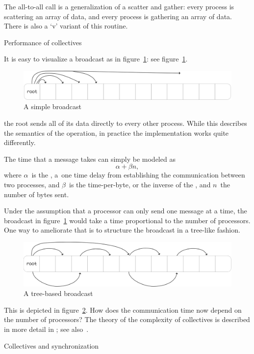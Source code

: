 The all-to-all call is a generalization of a scatter and gather: every
process is scattering an array of data, and every process is gathering
an array of data. There is also a `v' variant of this routine.

 {Performance of collectives}

It is easy to visualize a broadcast as in figure~\ref{fig:bcast-simple}:
see figure~\ref{fig:bcast-simple}.
\begin{figure}[ht]
  \includegraphics[scale=.08]{graphics/bcast-simple}
  \caption{A simple broadcast}
  \label{fig:bcast-simple}
\end{figure}
the root sends all of its data directly to every other process.
While this describes the semantics of the operation, in practice
the implementation works quite differently.

The time that a message takes can simply be modeled as
\[ \alpha +\beta n, \]
where $\alpha$~is the , a~one time
delay from establishing the communication between two processes,
and $\beta$~is the time-per-byte, or the inverse of the ,
and $n$~the number of bytes sent.

Under the assumption that
a processor can only send one message at a time,
the broadcast in
figure~\ref{fig:bcast-simple} would take a time proportional to the
number of processors. One way to ameliorate that is to structure the
broadcast in a tree-like fashion.
\begin{figure}[ht]
  \includegraphics[scale=.1]{graphics/bcast-tree}
  \caption{A tree-based broadcast}
  \label{fig:bcast-tree}
\end{figure}
This is depicted in figure~\ref{fig:bcast-tree}. How does the
communication time now depend on the number of processors? The theory
of the complexity of collectives is described in more detail in
; see also~\cite{Chan2007Collective}.

 {Collectives and synchronization}

